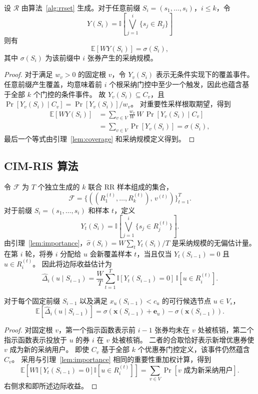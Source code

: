 \documentclass[sigconf,balance=false]{acmart}
\newcommand{\CIMRIS}{\textsc{CIM-RIS}}
\newcommand{\E}{\mathbb{E}}
\newcommand{\I}{\mathbb{I}}
\begin{document}
\begin{lemma}[条件根估计器]
\label{lem:importance}
设 $\mathcal{R}$ 由算法~\ref{alg:rrset} 生成。对于任意前缀 $S_i=(s_1,\ldots,s_i)$，$i\leq k$，令
\[
  Y(S_i)=\I\!\left[\bigvee_{j=1}^i\{s_j\in R_j\}\right]
\]
则有
\[
  \E[W Y(S_i)]=\sigma(S_i),
\]
其中 $\sigma(S_i)$ 为该前缀中 $i$ 张券产生的采纳规模。
\end{lemma}

\begin{proof}
对于满足 $w_v>0$ 的固定根 $v$，令 $Y_v(S_i)$ 表示无条件实现下的覆盖事件。
任意前缀产生覆盖，均意味着前 $i$ 个根采纳门控中至少一个触发，因此也蕴含基于全部 $k$ 个门控的条件事件。
故 $Y_v(S_i)\subseteq C_v$，且 $\Pr[Y_v(S_i)\mid C_v]=\Pr[Y_v(S_i)]/w_v$。
对重要性采样根取期望，得到
\begin{align*}
  \E[W Y(S_i)]
  &=\sum_{v\in V}\frac{w_v}{W}\,W\,
    \Pr[Y_v(S_i)\mid C_v]\\
  &=\sum_{v\in V}\Pr[Y_v(S_i)]
   =\sigma(S_i),
\end{align*}
最后一个等式由引理~\ref{lem:coverage} 和采纳规模定义得到。
\end{proof}

\subsection{\CIMRIS{} 算法}

令 $\mathcal{F}$ 为 $T$ 个独立生成的 $k$ 联合 RR 样本组成的集合，
\[
  \mathcal{F} =
  \{((R_1^{(t)},\ldots,R_k^{(t)}),\,v^{(t)})\}_{t=1}^T.
\]
对于前缀 $S_i=(s_1,\ldots,s_i)$ 和样本 $t$，定义
\[
  Y_t(S_i)=
  \I\!\left[\bigvee_{j=1}^{i}\{s_j\in R_j^{(t)}\}\right].
\]
由引理~\ref{lem:importance}，$\hat{\sigma}(S_i)=W\sum_tY_t(S_i)/T$ 是采纳规模的无偏估计量。
在第 $i$ 轮，将券 $i$ 分配给 $u$ 会新覆盖样本 $t$，当且仅当 $Y_t(S_{i-1})=0$ 且 $u\in R_i^{(t)}$。
因此将边际收益估计为
\[
  \widehat{\Delta}_i(u\mid S_{i-1})
  =\frac{W}{T}\sum_{t=1}^{T}
    \I[Y_t(S_{i-1})=0]\,\I[u\in R_i^{(t)}].
\]

\begin{lemma}[边际收益估计器]
\label{lem:marginal}
对于每个固定前缀 $S_{i-1}$ 以及满足 $x_u(S_{i-1})<c_u$ 的可行候选节点 $u\in V_s$，
\[
  \E[\widehat{\Delta}_i(u\mid S_{i-1})]
  =\sigma(\bm{x}(S_{i-1})+\bm{e}_u)
   -\sigma(\bm{x}(S_{i-1})).
\]
\end{lemma}

\begin{proof}
对固定根 $v$，第一个指示函数表示前 $i-1$ 张券均未在 $v$ 处被核销，第二个指示函数表示投放于 $u$ 的券 $i$ 在 $v$ 处被核销。
二者的合取恰好表示新增优惠券使 $v$ 成为新的采纳用户。
即使 $C_v$ 基于全部 $k$ 个优惠券门控定义，该事件仍然蕴含 $C_v$。
采用与引理~\ref{lem:importance} 相同的重要性重加权计算，得到
\[
  \E\!\left[W\I[Y_t(S_{i-1})=0]\I[u\in R_i^{(t)}]\right]
  =\sum_{v\in V}\Pr[v\text{ 成为新采纳用户}].
\]
右侧求和即所述边际收益。
\end{proof}
\end{document}
